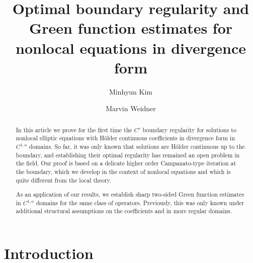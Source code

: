 \documentclass[11pt,reqno]{amsart}
\theoremstyle{plain}
\theoremstyle{definition}
\numberwithin{equation}{section}
\newcommand{\1}{\mathbbm{1}}
\begin{document}
\allowdisplaybreaks
\title[Optimal boundary regularity and Green function estimates]{Optimal boundary regularity and Green function estimates for nonlocal equations in divergence form}

\author{Minhyun Kim}
\address{Department of Mathematics \& Research Institute for Natural Sciences, Hanyang University, 04763 Seoul, Republic of Korea}

\author{Marvin Weidner}
\address{Institute for Applied Mathematics, University of Bonn, Endenicher Allee 60, 53115, Bonn, Germany}






 

\allowdisplaybreaks



\begin{abstract}
In this article we prove for the first time the $C^s$ boundary regularity for solutions to nonlocal elliptic equations with H\"older continuous coefficients in divergence form in $C^{1,\alpha}$ domains. So far, it was only known that solutions are H\"older continuous up to the boundary, and establishing their optimal regularity has remained an open problem in the field. Our proof is based on a delicate higher order Campanato-type iteration at the boundary, which we develop in the context of nonlocal equations and which is quite different from the local theory.

As an application of our results, we establish sharp two-sided Green function estimates in $C^{1,\alpha}$ domains for the same class of operators. Previously, this was only known under additional structural assumptions on the coefficients and in more regular domains.
\end{abstract}
\maketitle

\section{Introduction}  
\end{document}
